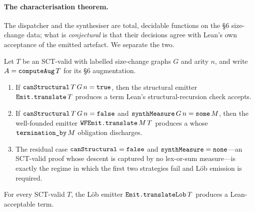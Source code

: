 \paragraph{The characterisation theorem.}
The dispatcher  and the synthesiser 
are total, decidable functions on the §6 size-change data; what is
\emph{conjectural} is that their decisions agree with Lean's
own acceptance of the emitted artefact. We separate the two.

\begin{conjecture}
\label{conj:dispatch}
Let \(T\) be an SCT-valid  with labelled size-change
graphs \(G\) and arity \(n\), and write
\(A=\texttt{computeAug}\,T\) for its §6 augmentation.
\begin{enumerate}
  \item If \(\texttt{canStructural}\,T\,G\,n = \mathtt{true}\), then the
    structural emitter \(\texttt{Emit.translate}\,T\) produces a term Lean's
    structural-recursion check accepts.
  \item If \(\texttt{canStructural}\,T\,G\,n = \mathtt{false}\) and
    \(\texttt{synthMeasure}\,G\,n = \texttt{some}\,M\), then the well-founded
    emitter \(\texttt{WFEmit.translate}\,M\,T\) produces a  whose
    \(\texttt{termination\_by}\,M\) obligation  discharges.
  \item The residual case
    \(\texttt{canStructural} = \mathtt{false}\) and
    \(\texttt{synthMeasure} = \texttt{none}\)---an SCT-valid proof whose
    descent is captured by no lex-or-sum measure---is exactly the regime
    in which the first two strategies fail and Löb emission is required.
\end{enumerate}
\end{conjecture}

\begin{conjecture}
\label{conj:lob}
For every SCT-valid  \(T\), the Löb emitter
\(\texttt{Emit.translateLob}\,T\) produces a Lean-acceptable term.
\end{conjecture}

